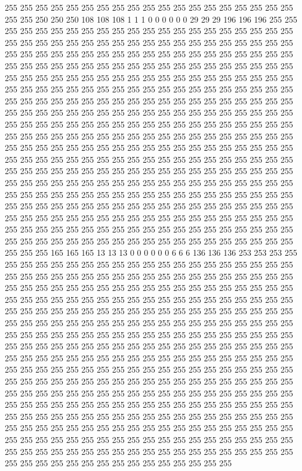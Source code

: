 255 255 255 255 255 255 255 255 255 255 255 255 255 255 255 255 255 255 255 255 255 250 250 250 108 108 108 1 1 1 0 0 0 0 0 0 29 29 29 196 196 196 255 255 255 255 255 255 255 255 255 255 255 255 255 255 255 255 255 255 255 255 255 255 255 255 255 255 255 255 255 255 255 255 255 255 255 255 255 255 255 255 255 255 255 255 255 255 255 255 255 255 255 255 255 255 255 255 255 255 255 255 255 255 255 255 255 255 255 255 255 255 255 255 255 255 255 255 255 255 255 255 255 255 255 255 255 255 
255 255 255 255 255 255 255 255 255 255 255 255 255 255 255 255 255 255 255 255 255 255 255 255 255 255 255 255 255 255 255 255 255 255 255 255 255 255 255 255 255 255 255 255 255 255 255 255 255 255 255 255 255 255 255 255 255 255 255 255 255 255 255 255 255 255 255 255 255 255 255 255 255 255 255 255 255 255 255 255 255 255 255 255 255 255 255 255 255 255 255 255 255 255 255 255 255 255 255 255 255 255 255 255 255 255 255 255 255 255 255 255 255 255 255 255 255 255 255 255 255 255 255 255 255 255 255 255 
255 255 255 255 255 255 255 255 255 255 255 255 255 255 255 255 255 255 255 255 255 255 255 255 255 255 255 255 255 255 255 255 255 255 255 255 255 255 255 255 255 255 255 255 255 255 255 255 255 255 255 255 255 255 255 255 255 255 255 255 255 255 255 255 255 255 255 255 255 255 255 255 255 255 255 255 255 255 255 255 255 255 255 255 255 255 255 255 255 255 255 255 255 255 255 255 255 255 255 255 255 255 255 255 255 255 255 255 255 255 255 255 255 255 255 255 255 255 255 255 255 255 255 255 255 255 255 255 
255 255 255 255 255 255 255 255 255 255 255 255 255 255 255 255 255 255 255 255 255 255 255 255 165 165 165 13 13 13 0 0 0 0 0 0 6 6 6 136 136 136 253 253 253 255 255 255 255 255 255 255 255 255 255 255 255 255 255 255 255 255 255 255 255 255 255 255 255 255 255 255 255 255 255 255 255 255 255 255 255 255 255 255 255 255 255 255 255 255 255 255 255 255 255 255 255 255 255 255 255 255 255 255 255 255 255 255 255 255 255 255 255 255 255 255 255 255 255 255 255 255 255 255 255 255 255 255 
255 255 255 255 255 255 255 255 255 255 255 255 255 255 255 255 255 255 255 255 255 255 255 255 255 255 255 255 255 255 255 255 255 255 255 255 255 255 255 255 255 255 255 255 255 255 255 255 255 255 255 255 255 255 255 255 255 255 255 255 255 255 255 255 255 255 255 255 255 255 255 255 255 255 255 255 255 255 255 255 255 255 255 255 255 255 255 255 255 255 255 255 255 255 255 255 255 255 255 255 255 255 255 255 255 255 255 255 255 255 255 255 255 255 255 255 255 255 255 255 255 255 255 255 255 255 255 255 
255 255 255 255 255 255 255 255 255 255 255 255 255 255 255 255 255 255 255 255 255 255 255 255 255 255 255 255 255 255 255 255 255 255 255 255 255 255 255 255 255 255 255 255 255 255 255 255 255 255 255 255 255 255 255 255 255 255 255 255 255 255 255 255 255 255 255 255 255 255 255 255 255 255 255 255 255 255 255 255 255 255 255 255 255 255 255 255 255 255 255 255 255 255 255 255 255 255 255 255 255 255 255 255 255 255 255 255 255 255 255 255 255 255 255 255 255 255 255 255 255 255 255 255 255 255 255 255 
